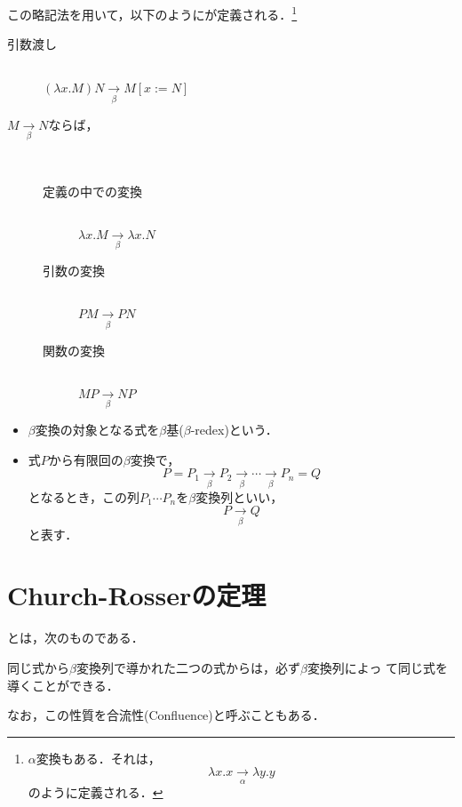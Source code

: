 この略記法を用いて，以下のようにが定義される．\footnote{$\alpha$変換もある．それは，
\[
 \lambda x. x \underset{\alpha}{\longrightarrow} \lambda y . y
\]
のように定義される．}

\begin{description}
 \item[引数渡し]  \mbox{} \\
            $(\lambda x . M) N \underset{\beta}{\longrightarrow} M[x:=N]$ 

 \item[$M \underset{\beta}{\longrightarrow} N$ならば，] \mbox{} \\
            \begin{description}
             \item[定義の中での変換] \mbox{} \\
                        $\lambda x . M \underset{\beta}{\longrightarrow} \lambda x . N$ 

             \item[引数の変換]  \mbox{} \\
                        $ PM \underset{\beta}{\longrightarrow} PN$ 
             \item[関数の変換]  \mbox{} \\
                        $MP \underset{\beta}{\longrightarrow} NP$
            \end{description}
\end{description}


\begin{itemize}
 \item $\beta$変換の対象となる式を$\beta$基($\beta$-redex)という．
 \item 式$P$から有限回の$\beta$変換で，
       \[
        P = P_1 \underset{\beta}{\longrightarrow} P_2 \underset{\beta}{\longrightarrow} \cdots
       \underset{\beta}{\longrightarrow} P_n = Q
       \]
       となるとき，この列$P_1 \cdots P_n$を$\beta$変換列といい，
       \[
        P \underset{\beta}{\longrightarrow} Q
       \]
       と表す．
\end{itemize}

\section{Church-Rosserの定理}
とは，次のものである．

\begin{mytheorem}
同じ式から$\beta$変換列で導かれた二つの式からは，必ず$\beta$変換列によっ
て同じ式を導くことができる．
\end{mytheorem}
なお，この性質を合流性(Confluence)と呼ぶこともある．

